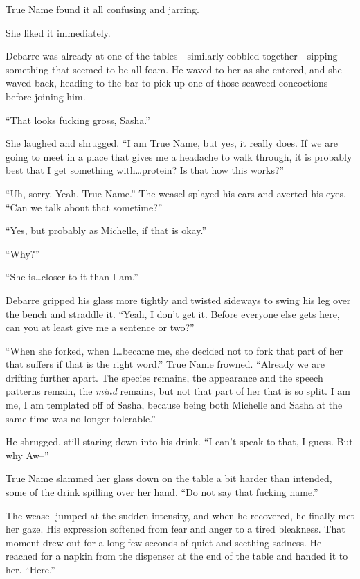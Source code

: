 True Name found it all confusing and jarring.

She liked it immediately.

Debarre was already at one of the tables---similarly cobbled together---sipping something that seemed to be all foam. He waved to her as she entered, and she waved back, heading to the bar to pick up one of those seaweed concoctions before joining him.

``That looks fucking gross, Sasha.''

She laughed and shrugged. ``I am True Name, but yes, it really does. If we are going to meet in a place that gives me a headache to walk through, it is probably best that I get something with\ldots protein? Is that how this works?''

``Uh, sorry. Yeah. True Name.'' The weasel splayed his ears and averted his eyes. ``Can we talk about that sometime?''

``Yes, but probably as Michelle, if that is okay.''

``Why?''

``She is\ldots closer to it than I am.''

Debarre gripped his glass more tightly and twisted sideways to swing his leg over the bench and straddle it. ``Yeah, I don't get it. Before everyone else gets here, can you at least give me a sentence or two?''

``When she forked, when I\ldots became me, she decided not to fork that part of her that suffers if that is the right word.'' True Name frowned. ``Already we are drifting further apart. The species remains, the appearance and the speech patterns remain, the \emph{mind} remains, but not that part of her that is so split. I am me, I am templated off of Sasha, because being both Michelle and Sasha at the same time was no longer tolerable.''

He shrugged, still staring down into his drink. ``I can't speak to that, I guess. But why Aw--''

True Name slammed her glass down on the table a bit harder than intended, some of the drink spilling over her hand. ``Do not say that fucking name.''

The weasel jumped at the sudden intensity, and when he recovered, he finally met her gaze. His expression softened from fear and anger to a tired bleakness. That moment drew out for a long few seconds of quiet and seething sadness. He reached for a napkin from the dispenser at the end of the table and handed it to her. ``Here.''

